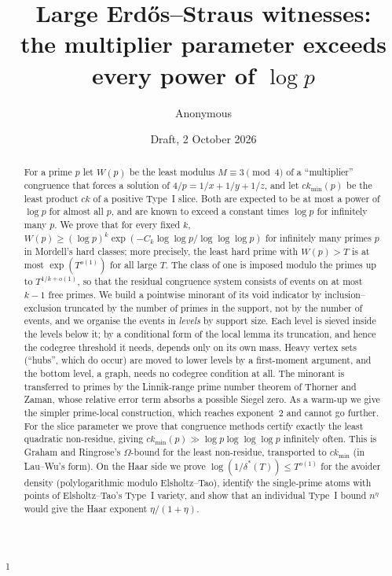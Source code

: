 \documentclass[11pt,reqno]{amsart}
\title[Large Erd\H{o}s--Straus witnesses]{Large Erd\H{o}s--Straus witnesses:\\
the multiplier parameter exceeds every power of $\log p$}
\author{Anonymous}
\date{Draft, 2 October 2026}
\theoremstyle{definition}
\newcommand{\ckmin}{ck_{\min}}
\begin{document}
\begin{abstract}
For a prime $p$ let $W(p)$ be the least modulus $M\equiv3\pmod4$ of a
``multiplier'' congruence that forces a solution of $4/p=1/x+1/y+1/z$, and
let $\ckmin(p)$ be the least product $ck$ of a positive Type~I slice.  Both
are expected to be at most a power of $\log p$ for almost all $p$, and are
known to exceed a constant times $\log p$ for infinitely many $p$.  We prove
that for every fixed $k$,
$W(p)\ge(\log p)^{k}\exp(-C_k\log\log p/\log\log\log p)$ for infinitely many
primes $p$ in Mordell's hard classes; more precisely, the least hard prime
with $W(p)>T$ is at most $\exp(T^{o(1)})$ for all large $T$.  The class of one is imposed modulo the
primes up to $T^{1/k+o(1)}$, so that the residual congruence system consists
of events on at most $k-1$ free primes.  We build a pointwise minorant of its
void indicator by inclusion--exclusion truncated by the number of primes in
the support, not by the number of events, and we organise the events in
\emph{levels} by support size.  Each level is sieved inside the levels below
it; by a conditional form of the local lemma its truncation, and hence the
codegree threshold it needs, depends only on its own mass.  Heavy vertex sets
(``hubs'', which do occur) are moved to lower levels by a first-moment
argument, and the bottom level, a graph, needs no codegree condition at all.
The minorant is transferred to primes by the Linnik-range prime number
theorem of Thorner and Zaman, whose relative error term absorbs a possible
Siegel zero.  As a warm-up we give the simpler prime-local construction,
which reaches exponent~$2$ and cannot go further.  For the slice parameter we
prove that congruence methods certify exactly the least quadratic
non-residue, giving $\ckmin(p)\gg\log p\log\log\log p$ infinitely often.  This is Graham and
Ringrose's $\Omega$-bound for the least non-residue, transported to $\ckmin$
(in Lau--Wu's form).  On the Haar side we prove
$\log(1/\delta^*(T))\le T^{o(1)}$ for the avoider density (polylogarithmic
modulo Elsholtz--Tao), identify the single-prime atoms with points of
Elsholtz--Tao's Type~I variety, and show that an individual Type~I bound
$n^{\eta}$ would give the Haar exponent $\eta/(1+\eta)$.
\end{abstract}

\maketitle
\hbox{\footnotesize\textsuperscript{1}}
\end{document}
